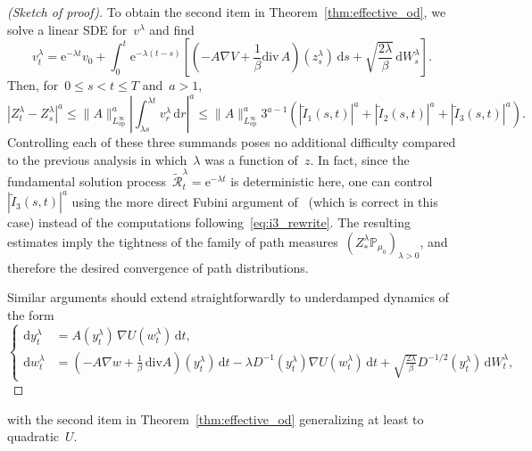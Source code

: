 \documentclass[10pt]{article}
\newcommand{\cR}{\mathcal{R}}
\renewcommand{\d}{\mathrm{d}}
\newcommand{\e}{\mathrm{e}}
\renewcommand{\P}{\mathbb{P}}
\renewcommand{\div}{\mathrm{div}}
\newcommand{\1}{\mathbbm 1}
\begin{document}
\begin{proof}[(Sketch of proof)]
    To obtain the second item in Theorem~\ref{thm:effective_od}, we solve a linear SDE for~$v^\lambda$ and find
    \begin{equation}
        v_t^\lambda = \e^{-\lambda t}v_0 + \int_0^t \e^{-\lambda(t-s)}\left[\left(-A\nabla V + \frac1\beta\div\,A\right)(z_s^\lambda)\,\d s + \sqrt{\frac{2\lambda}{\beta}}\,\d W_s^\lambda\right].
    \end{equation}
    Then, for~$0\leq s < t\leq T$ and~$a>1$,
    \begin{equation}
        \left|Z_t^\lambda - Z_s^\lambda\right|^a \leq \|A\|_{L^\infty_{\mathrm{op}}}^a\left|\int_{\lambda s}^{\lambda t}v_r^\lambda\,\d r\right|^a\leq \|A\|_{L^\infty_{\mathrm{op}}}^a3^{a-1}\left(\left|\widetilde{I}_1(s,t)\right|^a+\left|\widetilde{I}_2(s,t)\right|^a+\left|\widetilde{I}_3(s,t)\right|^a\right).
    \end{equation}
    Controlling each of these three summands poses no additional difficulty compared to the previous analysis in which~$\lambda$ was a function of~$z$.
    In fact, since the fundamental solution process~$\widetilde{\cR}^\lambda_t = \e^{-\lambda t}$ is deterministic here, one can control~$|\widetilde{I}_3(s,t)|^a$ using the more direct Fubini argument of~\cite[Lemma 3.1]{WSW24} (which is correct in this case) instead of the computations following~\eqref{eq:i3_rewrite}.
    The resulting estimates imply the tightness of the family of path measures~$(Z^\lambda_*\P_{\mu_0})_{\lambda>0}$, and therefore the desired convergence of path distributions.

    Similar arguments should extend straightforwardly to underdamped dynamics of the form
        \begin{equation}
        \label{eq:effectiwe_ul_mod}
        \left\{\begin{aligned}
        \d y_t^\lambda &= A(y_t^\lambda)\,\nabla U(w_t^\lambda)\,\d t,\\
        \d w_t^\lambda &= \left(-A\nabla w + \frac1\beta\,\div A\right)(y_t^\lambda)\,\d t - \lambda D^{-1}(y_t^\lambda) \nabla U(w_t^\lambda)\,\d t + \sqrt{\frac{2\lambda}{\beta}}D^{-1/2}(y_t^\lambda)\,\d W_t^\lambda,
        \end{aligned}\right.
    \end{equation}
    \end{proof}
    with the second item in Theorem~\ref{thm:effective_od} generalizing at least to quadratic~$U$.
\end{document}
